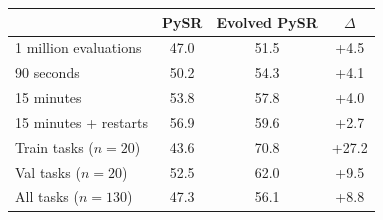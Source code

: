 \caption{SRBench ground-truth recovery rates (\%) over 10 random seeds. Rows above the line use
the 90 held-out test tasks; rows below use 1 million evaluations. $\Delta$ is Evolved PySR minus PySR.}
\label{tab:srbench2}

\footnotesize
\begin{tabular}{lccc}
\toprule
& \multicolumn{1}{c}{PySR} & \multicolumn{1}{c}{Evolved PySR} & \multicolumn{1}{c}{$\Delta$} \\
\midrule
1 million evaluations & 47.0 & 51.5 & +4.5 \\
90 seconds & 50.2 & 54.3 & +4.1 \\
15 minutes & 53.8 & 57.8 & +4.0 \\
15 minutes + restarts & 56.9 & 59.6 & +2.7 \\
\midrule
Train tasks ($n=20$) & 43.6 & 70.8 & +27.2 \\
Val tasks ($n=20$) & 52.5 & 62.0 & +9.5 \\
All tasks ($n=130$) & 47.3 & 56.1 & +8.8 \\
\bottomrule
\end{tabular}